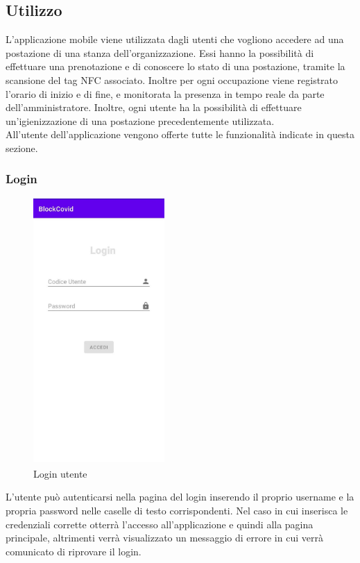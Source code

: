 	\subsection{Utilizzo}
	L'applicazione mobile viene utilizzata dagli utenti che vogliono accedere ad una postazione di una stanza dell'organizzazione. Essi hanno la possibilità di effettuare una prenotazione e di conoscere lo stato di una postazione, tramite la scansione del tag NFC associato. Inoltre per ogni occupazione viene registrato l'orario di inizio e di fine, e monitorata la presenza in tempo reale da parte dell'amministratore. Inoltre, ogni utente ha la possibilità di effettuare un'igienizzazione di una postazione precedentemente utilizzata. 
	\\All'utente dell'applicazione vengono offerte tutte le funzionalità indicate in questa sezione.
	\subsubsection{Login}
	\begin{figure}[H]
		\centering
		\includegraphics[width=5cm]{res/images/login.png}
		\caption{Login utente}
	\end{figure}
	L'utente può autenticarsi nella pagina del login inserendo il proprio username e la propria password nelle caselle di testo corrispondenti.
	Nel caso in cui inserisca le credenziali corrette otterrà l'accesso all'applicazione e quindi alla pagina principale, altrimenti verrà visualizzato un messaggio di errore in cui verrà comunicato di riprovare il login.
	
